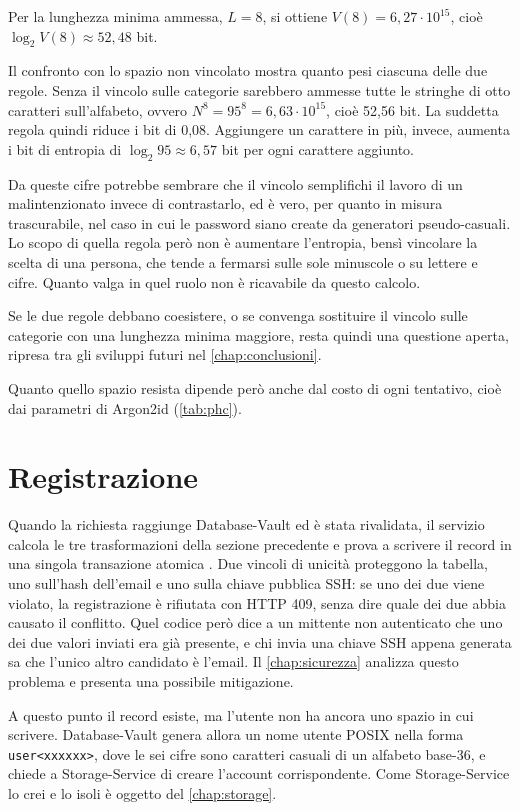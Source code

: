 Per la lunghezza minima ammessa, $L = 8$, si ottiene $V(8) = 6{,}27 \cdot 10^{15}$, cioè
$\log_2 V(8) \approx 52{,}48$ bit.

Il confronto con lo spazio non vincolato mostra quanto pesi ciascuna delle due regole. Senza il
vincolo sulle categorie sarebbero ammesse tutte le stringhe di otto caratteri sull'alfabeto, ovvero
$N^8 = 95^8 = 6{,}63 \cdot 10^{15}$, cioè 52,56 bit. La suddetta regola quindi riduce i bit di 0,08. 
Aggiungere un carattere in più, invece, aumenta i bit di entropia di $\log_2 95 \approx 6{,}57$ bit per ogni
carattere aggiunto.

Da queste cifre potrebbe sembrare che il vincolo semplifichi il lavoro di un malintenzionato invece
di contrastarlo, ed è vero, per quanto in misura trascurabile, nel caso in cui le password siano create da 
generatori pseudo-casuali. 
Lo scopo di quella regola però non è aumentare l'entropia, bensì vincolare la scelta di
una persona, che tende a fermarsi sulle sole minuscole o su lettere e cifre. Quanto valga in quel
ruolo non è ricavabile da questo calcolo.

Se le due regole debbano coesistere, o se convenga sostituire il vincolo sulle categorie con una
lunghezza minima maggiore, resta quindi una questione aperta, ripresa tra gli sviluppi futuri nel
\autoref{chap:conclusioni}.


Quanto quello spazio resista dipende però anche dal costo di ogni tentativo, cioè dai parametri di
Argon2id (\autoref{tab:phc}).

\section{Registrazione}

Quando la richiesta raggiunge Database-Vault ed è stata rivalidata, il servizio calcola le tre
trasformazioni della sezione precedente e prova a scrivere il record in una singola transazione
atomica \cite{ramusb-code-saveuser}. Due vincoli di unicità proteggono la tabella, uno
sull'hash dell'email e uno sulla chiave pubblica SSH: se uno dei due viene violato, la registrazione
è rifiutata con HTTP 409, senza dire quale dei due abbia causato il conflitto. Quel codice
però dice a un mittente non autenticato che uno dei due valori inviati era
già presente, e chi invia una chiave SSH appena generata sa che l'unico altro candidato è l'email.
Il \autoref{chap:sicurezza} analizza questo problema e presenta una possibile mitigazione.

A questo punto il record esiste, ma l'utente non ha ancora uno spazio in cui scrivere.
Database-Vault genera allora un nome utente POSIX nella forma
\texttt{user<xxxxxx>}, dove le sei cifre sono caratteri casuali di un
alfabeto base-36, e chiede a Storage-Service di creare l'account corrispondente. Come
Storage-Service lo crei e lo isoli è oggetto del \autoref{chap:storage}.

